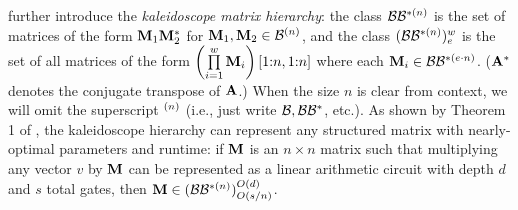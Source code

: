     \citet{dao2020kaleidoscope} further introduce the \emph{kaleidoscope matrix hierarchy}: the class $\mathcal{B}\mathcal{B}^{*(n)}$ is the set of matrices of the form $\mathbf{M}_1\mathbf{M}_2^*$ for $\mathbf{M}_1,\mathbf{M}_2 \in \mathcal{B}^{(n)}$, and the class $(\mathcal{B}\mathcal{B}^{*(n)})^w_e$ is the set of all matrices of the form $\left( \prod\limits_{i=1}^{w} \mathbf{M}_i \right)[1{:}n, 1{:}n]$ where each $\mathbf{M}_i \in \mathcal{B}\mathcal{B}^{*(e\cdot n)}$. ($\mathbf{A}^*$ denotes the conjugate transpose of $\mathbf{A}$.)
    When the size $n$ is clear from context, we will omit the superscript $^{(n)}$ (i.e., just write $\mathcal{B},\mathcal{B}\mathcal{B}^*$, etc.).
As shown by Theorem 1 of \citet{dao2020kaleidoscope}, the kaleidoscope hierarchy can represent any structured matrix with nearly-optimal parameters and runtime: if $\mathbf{M}$ is an $n \times n$ matrix such that multiplying any vector $v$ by $\mathbf{M}$ can be represented as a linear arithmetic circuit with depth $d$ and $s$ total gates, then $\mathbf{M} \in (\mathcal{B}\mathcal{B}^{*(n)})^{O(d)}_{O(s/n)}$. 
    

